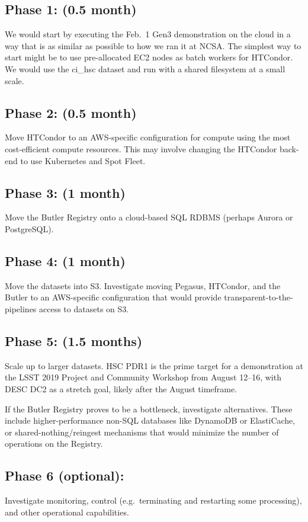 \subsection{Phase 1: (0.5 month)} \label{sec:phase-1}
We would start by executing the Feb.~1 Gen3 demonstration on the cloud in a way that is as similar as possible to how we ran it at NCSA.
The simplest way to start might be to use pre-allocated EC2 nodes as batch workers for HTCondor.
We would use the ci\_hsc dataset and run with a shared filesystem at a small scale.

\subsection{Phase 2: (0.5 month)} \label{sec:phase-2}
Move HTCondor to an AWS-specific configuration for compute using the most cost-efficient compute resources.
This may involve changing the HTCondor back-end to use Kubernetes and Spot Fleet.

\subsection{Phase 3: (1 month)} \label{sec:phase-3}
Move the Butler Registry onto a cloud-based SQL RDBMS (perhaps Aurora or PostgreSQL).

\subsection{Phase 4: (1 month)} \label{sec:phase-4}
Move the datasets into S3.
Investigate moving Pegasus, HTCondor, and the Butler to an AWS-specific configuration that would provide transparent-to-the-pipelines access to datasets on S3.

\subsection{Phase 5: (1.5 months)} \label{sec:phase-5}
Scale up to larger datasets.
HSC PDR1 is the prime target for a demonstration at the LSST 2019 Project and Community Workshop from August 12–16, with DESC DC2 as a stretch goal, likely after the August timeframe.

If the Butler Registry proves to be a bottleneck, investigate alternatives.
These include higher-performance non-SQL databases like DynamoDB or ElastiCache, or shared-nothing/reingest mechanisms that would minimize the number of operations on the Registry.

\subsection{Phase 6 (optional):} \label{sec:phase-6}
Investigate monitoring, control (e.g.~terminating and restarting some processing), and other operational capabilities.

